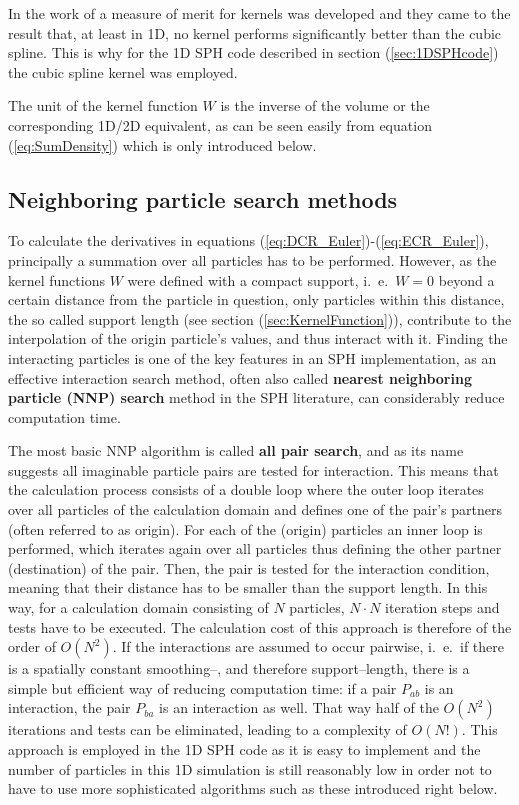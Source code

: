 \documentclass[11pt,a4paper,twoside]{report}
\begin{document}
In the work of \cite{Fulk1996} a measure of merit for kernels was developed and
they came to the result that, at least in 1D, no kernel performs significantly better than the cubic spline.
This is why for the 1D SPH code described in section (\ref{sec:1DSPHcode}) the cubic spline kernel was employed.

The unit of the kernel function $W$ is the inverse of the volume or the corresponding 1D/2D equivalent, as can be seen easily from equation (\ref{eq:SumDensity}) which is only introduced below.


\subsection{Neighboring particle search methods}
\label{sec:NNPS}
To calculate the derivatives in equations (\ref{eq:DCR_Euler})-(\ref{eq:ECR_Euler}), principally a
summation over all particles has to be performed. However, as the kernel
functions $W$ were defined with a compact support, i.\ e.\ $W=0$ beyond a certain distance from the particle in question, only particles within this distance, the so called support length (see section (\ref{sec:KernelFunction})), contribute to the interpolation of the origin particle's values, and thus interact with it. Finding the interacting particles is one of the key features in an SPH implementation, as an effective interaction search method, often also called {\bf nearest neighboring particle (NNP) search} method in the SPH literature, can considerably reduce computation time. 

The most basic NNP algorithm is called {\bf all pair search}, and as its name
suggests all imaginable particle pairs are tested for interaction. This means
that the calculation process consists of a double loop where the outer loop
iterates over all particles of the calculation domain and defines one of the pair's partners (often
referred to as origin). For each of the (origin) particles an inner loop is
performed, which iterates again over all particles thus defining the other
partner (destination) of the pair. Then, the pair is tested for the
interaction condition, meaning that their distance has to be smaller than the
support length. In this way, for a calculation domain consisting of $N$
particles, $N\cdot N$ iteration steps and tests have to be executed. The
calculation cost of this approach is therefore of the order of $O(N^2)$. 
If the interactions are assumed to occur pairwise, i.\ e.\ if there is a spatially constant
smoothing--, and therefore support--length,
there is a simple but efficient way of reducing computation
time: if a pair $P_{ab}$ is an interaction, the pair
$P_{ba}$ is an interaction as well. That way half of the $O(N^2)$ iterations
and tests can be eliminated, leading to a complexity of $O(N!)$. 
This approach is employed in the 1D SPH code as it is easy to
implement \cite{Liu2003} and the number of particles in this 1D simulation is
still reasonably low in order not to have to use more sophisticated algorithms
such as these introduced right below.
\end{document}
